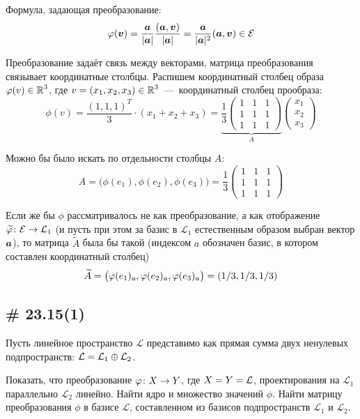 \documentclass[a4paper,12pt]{article}
\begin{document}
  \begin{solution}
    Формула, задающая преобразование:
    \[
      \varphi(\boldsymbol v) = \frac{\boldsymbol a}{|\boldsymbol a|} \frac{(\boldsymbol a, \boldsymbol v)}{|\boldsymbol a|}
      = \frac{\boldsymbol a}{|\boldsymbol a|^2} (\boldsymbol a, \boldsymbol v) \in \mathcal E
    \]
    
    Преобразование задаёт связь между векторами, матрица преобразования связывает координатные столбцы.
    Распишем координатный столбец образа $\phi(v) \hm\in \RR^3$, где $v \hm= (x_1, x_2, x_3) \hm\in \RR^3$~---~координатный столбец прообраза:
    \[
      \phi(v) = \frac{(1, 1, 1)^T}{3} \cdot (x_1 + x_2 + x_3)
      = \underbrace{\frac{1}{3}\begin{pmatrix}
        1 & 1 & 1\\
        1 & 1 & 1\\
        1 & 1 & 1
      \end{pmatrix}}_{A} \begin{pmatrix}
        x_1 \\ x_2 \\ x_3
      \end{pmatrix}
    \]
    
    Можно бы было искать по отдельности столбцы $A$:
    \[
      A = \bigl(\phi(e_1), \phi(e_2), \phi(e_3)\bigr) = \frac{1}{3}\begin{pmatrix}
        1 & 1 & 1\\
        1 & 1 & 1\\
        1 & 1 & 1
      \end{pmatrix}
    \]
    
    Если же бы $\phi$ рассматривалось не как преобразование, а как отображение $\widetilde \phi\colon \mathcal E \hm\to \mathcal L_1$ (и пусть при этом за базис в $\mathcal L_1$ естественным образом выбран вектор $\boldsymbol a$), то матрица $\widetilde A$ была бы такой (индексом $a$ обозначен базис, в котором составлен координатный столбец)
    \[
      \widetilde A \hm= \bigl(\phi(e_1)_a, \phi(e_2)_a, \phi(e_3)_a\bigr) \hm= (1/3, 1/3, 1/3)
    \]
  \end{solution}
  
  
  \subsection{\# 23.15(1)}
  
  Пусть линейное пространство $\mathcal L$ представимо как прямая сумма двух ненулевых подпространств: $\mathcal L \hm= \mathcal L_1 \oplus \mathcal L_2$.
  
  Показать, что преобразование $\phi\colon X \hm\to Y$, где $X \hm= Y \hm= \mathcal L$, проектирования на $\mathcal L_1$ параллельно $\mathcal L_2$ линейно.
  Найти ядро и множество значений $\phi$.
  Найти матрицу преобразования $\phi$ в базисе $\mathcal L$, составленном из базисов подпространств $\mathcal L_1$ и $\mathcal L_2$.
  
\end{document}
